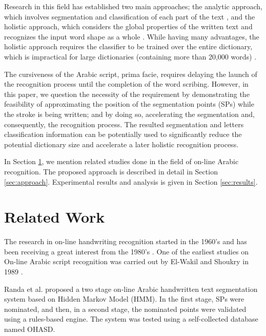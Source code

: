 \documentclass[10pt, conference, compsocconf]{IEEEtran}
\begin{document}
Research in this field has established two main approaches; the analytic approach, which involves segmentation and classification of each part of the text \cite{abdulla2008off, sari2002off, Dinges2011}, and the holistic approach, which considers the global properties of the written text and recognizes the input word shape as a whole \cite{biadsy2011segmentation, saabni2009hierarchical}. 
While having many advantages, the holistic approach requires the classifier to be trained over the entire dictionary, which is impractical for large dictionaries (containing more than 20,000 words) \cite{elanwar2012unconstrained}.

The cursiveness of the Arabic script, prima facie, requires delaying the launch of the recognition process until the completion of the word scribing. 
However, in this paper, we question the necessity of the requirement by demonstrating the feasibility of approximating the position of the segmentation points (SPs) while the stroke is being written; and by doing so, accelerating the segmentation and, consequently, the recognition process. 
The resulted segmentation and letters classification information can be potentially used to significantly reduce the potential dictionary size and accelerate a later holistic recognition process.

In Section \ref{sec:related_work}, we mention related studies done in the field of on-line Arabic recognition. 
The proposed approach is described in detail in Section \ref{sec:approach}. Experimental results and analysis is given in Section \ref{sec:results}. 

\section{Related Work}
\label{sec:related_work}

The research in on-line handwriting recognition started in the 1960's and has been receiving a great interest from the 1980's \cite{tagougui2013online}. 
One of the earliest studies on On-line Arabic script recognition was carried out by El-Wakil and Shoukry in 1989 \cite{el1989line}.

Randa et al. \cite{elanwar2012unconstrained} proposed a two stage on-line Arabic handwritten text segmentation system based on Hidden Markov Model (HMM). 
In the first stage, SPs were nominated, and then, in a second stage, the nominated points were validated using a rules-based engine. 
The system was tested using a self-collected database named OHASD.
\end{document}
